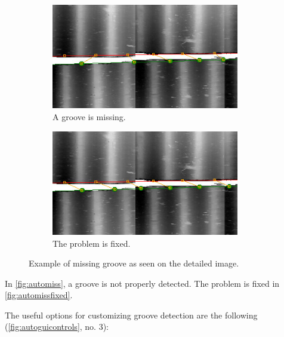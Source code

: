 \begin{figure}[!ht]
\centering
    \begin{subfigure}[t]{0.45\textwidth}
    \centering
    \includegraphics[width=0.9\textwidth]{images/auto-missing-groove}
    \caption{A groove is missing.}
    \label{fig:automiss}
    \end{subfigure}
    \begin{subfigure}[t]{0.45\textwidth}
    \centering
    \includegraphics[width=0.9\textwidth]{images/auto-missing-fixed}
    \caption{The problem is fixed.}
    \label{fig:automissfixed}
    \end{subfigure}
    \caption{Example of missing groove as seen on the detailed image.}
    \label{fig:automissgroove}
\end{figure}

In \autoref{fig:automiss}, a groove is not properly detected. The problem is fixed in \autoref{fig:automissfixed}.

The useful options for customizing groove detection are the following (\autoref{fig:autoguicontrols}, no. 3):

